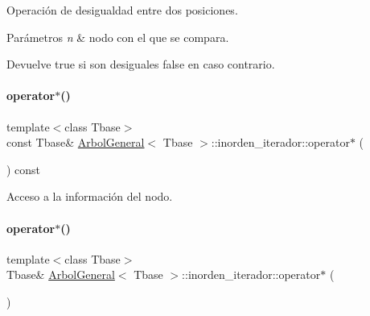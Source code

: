 Operación de desigualdad entre dos posiciones. 


\begin{DoxyParams}{Parámetros}
{\em n} & nodo con el que se compara. \\
\hline
\end{DoxyParams}
\begin{DoxyReturn}{Devuelve}
true si son desiguales false en caso contrario. 
\end{DoxyReturn}
\hypertarget{classArbolGeneral_1_1inorden__iterador_a170f4e8b9dbc9694cee3e22cebf17035}{}\label{classArbolGeneral_1_1inorden__iterador_a170f4e8b9dbc9694cee3e22cebf17035} 
\paragraph{\texorpdfstring{operator$\ast$()}{operator*()}\hspace{0.1cm}{\footnotesize\ttfamily [1/2]}}
{\footnotesize\ttfamily template$<$class Tbase$>$ \\
const Tbase\& \hyperlink{classArbolGeneral}{Arbol\+General}$<$ Tbase $>$\+::inorden\+\_\+iterador\+::operator$\ast$ (\begin{DoxyParamCaption}{ }\end{DoxyParamCaption}) const\hspace{0.3cm}{\ttfamily [inline]}}



Acceso a la información del nodo. 

\hypertarget{classArbolGeneral_1_1inorden__iterador_a566d603aa2bbca6c429031785497b116}{}\label{classArbolGeneral_1_1inorden__iterador_a566d603aa2bbca6c429031785497b116} 
\paragraph{\texorpdfstring{operator$\ast$()}{operator*()}\hspace{0.1cm}{\footnotesize\ttfamily [2/2]}}
{\footnotesize\ttfamily template$<$class Tbase$>$ \\
Tbase\& \hyperlink{classArbolGeneral}{Arbol\+General}$<$ Tbase $>$\+::inorden\+\_\+iterador\+::operator$\ast$ (\begin{DoxyParamCaption}{ }\end{DoxyParamCaption})\hspace{0.3cm}{\ttfamily [inline]}}

